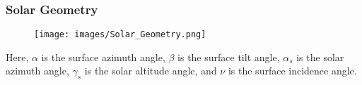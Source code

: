 \begin{frame}
    \frametitle{Solar Geometry}    
    \begin{figure}
        \centering
        \texttt{[image: images/Solar\_Geometry.png]}
    \end{figure}
    Here, \(\alpha\) is the surface azimuth angle, \(\beta\) is the surface tilt angle, \(\alpha_{s}\) is the solar azimuth angle,
    \(\gamma_{s}\) is the solar altitude angle, and \(\nu\) is the surface incidence angle.
\end{frame}